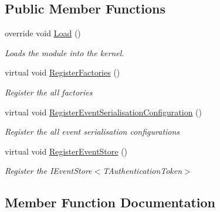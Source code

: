 \subsection*{Public Member Functions}
\begin{DoxyCompactItemize}
\item 
override void \hyperlink{classCqrs_1_1Ninject_1_1Azure_1_1BlobStorage_1_1Configuration_1_1BlobStoragEventStoreModule_a76808b1263f1086b834a21ad82a0604f_a76808b1263f1086b834a21ad82a0604f}{Load} ()
\begin{DoxyCompactList}\small\item\em Loads the module into the kernel. \end{DoxyCompactList}\item 
virtual void \hyperlink{classCqrs_1_1Ninject_1_1Azure_1_1BlobStorage_1_1Configuration_1_1BlobStoragEventStoreModule_a5afa83a73b65a61272d3c18a2f6fd214_a5afa83a73b65a61272d3c18a2f6fd214}{Register\+Factories} ()
\begin{DoxyCompactList}\small\item\em Register the all factories \end{DoxyCompactList}\item 
virtual void \hyperlink{classCqrs_1_1Ninject_1_1Azure_1_1BlobStorage_1_1Configuration_1_1BlobStoragEventStoreModule_a546c871cff486df5efba7e0f9e3ceb96_a546c871cff486df5efba7e0f9e3ceb96}{Register\+Event\+Serialisation\+Configuration} ()
\begin{DoxyCompactList}\small\item\em Register the all event serialisation configurations \end{DoxyCompactList}\item 
virtual void \hyperlink{classCqrs_1_1Ninject_1_1Azure_1_1BlobStorage_1_1Configuration_1_1BlobStoragEventStoreModule_a579cbe7615e4cf812946ff43e3a5aebd_a579cbe7615e4cf812946ff43e3a5aebd}{Register\+Event\+Store} ()
\begin{DoxyCompactList}\small\item\em Register the I\+Event\+Store$<$\+T\+Authentication\+Token$>$ \end{DoxyCompactList}\end{DoxyCompactItemize}


\subsection{Member Function Documentation}
\mbox{\label{classCqrs_1_1Ninject_1_1Azure_1_1BlobStorage_1_1Configuration_1_1BlobStoragEventStoreModule_a76808b1263f1086b834a21ad82a0604f_a76808b1263f1086b834a21ad82a0604f}} 
